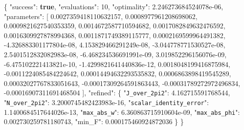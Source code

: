\documentclass[
  10pt,
]{article}
\newenvironment{Shaded}{}{}
\newcommand{\DataTypeTok}[1]{\textcolor[rgb]{0.56,0.13,0.00}{#1}}
\newcommand{\DecValTok}[1]{\textcolor[rgb]{0.25,0.63,0.44}{#1}}
\newcommand{\FloatTok}[1]{\textcolor[rgb]{0.25,0.63,0.44}{#1}}
\newcommand{\FunctionTok}[1]{\textcolor[rgb]{0.02,0.16,0.49}{#1}}
\newcommand{\KeywordTok}[1]{\textcolor[rgb]{0.00,0.44,0.13}{\textbf{#1}}}
\newcommand{\OtherTok}[1]{\textcolor[rgb]{0.00,0.44,0.13}{#1}}
\begin{document}
\begin{Shaded}
\begin{Highlighting}[]
\FunctionTok{\{}
  \DataTypeTok{"success"}\FunctionTok{:} \KeywordTok{true}\FunctionTok{,}
  \DataTypeTok{"evaluations"}\FunctionTok{:} \DecValTok{10}\FunctionTok{,}
  \DataTypeTok{"optimality"}\FunctionTok{:} \FloatTok{2.246273684524078e{-}06}\FunctionTok{,}
  \DataTypeTok{"parameters"}\FunctionTok{:} \OtherTok{[}
    \FloatTok{0.0027359418110632157}\OtherTok{,}
    \FloatTok{0.0008977961208698062}\OtherTok{,}
    \FloatTok{0.0009821627540353359}\OtherTok{,}
    \FloatTok{0.0014672587710594682}\OtherTok{,}
    \FloatTok{0.0017082849632476592}\OtherTok{,}
    \FloatTok{0.0016309927878994368}\OtherTok{,}
    \FloatTok{0.0011871749389115777}\OtherTok{,}
    \FloatTok{0.0002169599964491382}\OtherTok{,}
    \FloatTok{{-}4.326883301177804e{-}08}\OtherTok{,}
    \FloatTok{4.153829466291249e{-}08}\OtherTok{,}
    \FloatTok{{-}3.044778771530527e{-}08}\OtherTok{,}
    \FloatTok{2.5401512832082983e{-}08}\OtherTok{,}
    \FloatTok{{-}6.468234536691991e{-}09}\OtherTok{,}
    \FloatTok{3.019852296156076e{-}09}\OtherTok{,}
    \FloatTok{{-}6.475102221413821e{-}10}\OtherTok{,}
    \FloatTok{{-}1.4299821641440836e{-}12}\OtherTok{,}
    \FloatTok{0.0018048199416875984}\OtherTok{,}
    \FloatTok{{-}0.0011224085484224642}\OtherTok{,}
    \FloatTok{0.00014494632293535832}\OtherTok{,}
    \FloatTok{0.0006863898419545289}\OtherTok{,}
    \FloatTok{0.00032027767833051643}\OtherTok{,}
    \FloatTok{{-}0.00017309264591863443}\OtherTok{,}
    \FloatTok{{-}0.00031789272972496834}\OtherTok{,}
    \FloatTok{{-}0.00016907311691468504}
  \OtherTok{]}\FunctionTok{,}
  \DataTypeTok{"refined"}\FunctionTok{:} \FunctionTok{\{}
    \DataTypeTok{"\nolinkurl{J_over_2pi2}"}\FunctionTok{:} \FloatTok{4.162715591768544}\FunctionTok{,}
    \DataTypeTok{"\nolinkurl{N_over_2pi2}"}\FunctionTok{:} \FloatTok{3.2000745482423983e{-}16}\FunctionTok{,}
    \DataTypeTok{"\nolinkurl{scalar_identity_error}"}\FunctionTok{:} \FloatTok{1.1400684517644026e{-}13}\FunctionTok{,}
    \DataTypeTok{"\nolinkurl{max_abs_w}"}\FunctionTok{:} \FloatTok{6.360863715910604e{-}09}\FunctionTok{,}
    \DataTypeTok{"\nolinkurl{max_abs_phi}"}\FunctionTok{:} \FloatTok{0.002730259781180743}\FunctionTok{,}
    \DataTypeTok{"min\_F"}\FunctionTok{:} \FloatTok{0.000175460924872036}
  \FunctionTok{\}}
\FunctionTok{\}}
\end{Highlighting}
\end{Shaded}
\end{document}
